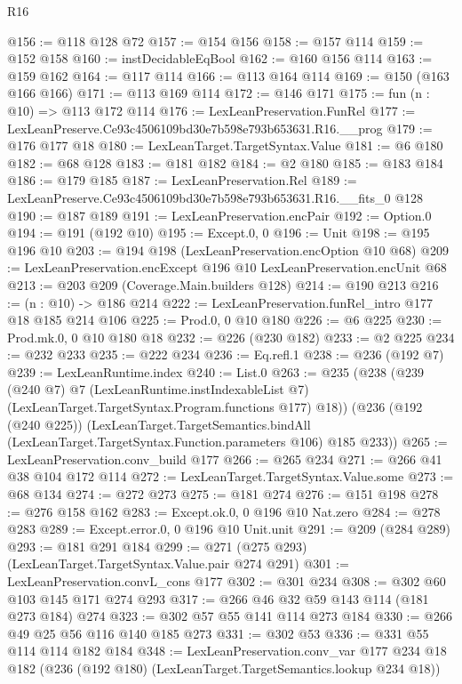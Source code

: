 \begin{lexlean}{R16}
\begin{coremodule}
@156 := @118 @128 @72
@157 := @154 @156
@158 := @157 @114
@159 := @152 @158
@160 := instDecidableEqBool
@162 := @160 @156 @114
@163 := @159 @162
@164 := @117 @114
@166 := @113 @164 @114
@169 := @150 (@163 @166 @166)
@171 := @113 @169 @114
@172 := @146 @171
@175 := fun (n : @10) => @113 @172 @114
@176 := LexLeanPreservation.FunRel
@177 := LexLeanPreserve.Ce93c4506109bd30e7b598e793b653631.R16.__prog
@179 := @176 @177 @18
@180 := LexLeanTarget.TargetSyntax.Value
@181 := @6 @180
@182 := @68 @128
@183 := @181 @182
@184 := @2 @180
@185 := @183 @184
@186 := @179 @185
@187 := LexLeanPreservation.Rel
@189 := LexLeanPreserve.Ce93c4506109bd30e7b598e793b653631.R16.__fits_0 @128
@190 := @187 @189
@191 := LexLeanPreservation.encPair
@192 := Option.{0}
@194 := @191 (@192 @10)
@195 := Except.{0, 0}
@196 := Unit
@198 := @195 @196 @10
@203 := @194 @198 (LexLeanPreservation.encOption @10 @68)
@209 := LexLeanPreservation.encExcept @196 @10 LexLeanPreservation.encUnit @68
@213 := @203 @209 (Coverage.Main.builders @128)
@214 := @190 @213
@216 := (n : @10) -> @186 @214
@222 := LexLeanPreservation.funRel_intro @177 @18 @185 @214 @106
@225 := Prod.{0, 0} @10 @180
@226 := @6 @225
@230 := Prod.mk.{0, 0} @10 @180 @18
@232 := @226 (@230 @182)
@233 := @2 @225
@234 := @232 @233
@235 := @222 @234
@236 := Eq.refl.{1}
@238 := @236 (@192 @7)
@239 := LexLeanRuntime.index
@240 := List.{0}
@263 := @235
    (@238
      (@239
        (@240 @7)
        @7
        (LexLeanRuntime.instIndexableList @7)
        (LexLeanTarget.TargetSyntax.Program.functions @177)
        @18))
    (@236
      (@192 (@240 @225))
      (LexLeanTarget.TargetSemantics.bindAll
        (LexLeanTarget.TargetSyntax.Function.parameters @106)
        @185
        @233))
@265 := LexLeanPreservation.conv_build @177
@266 := @265 @234
@271 := @266 @41 @38 @104 @172 @114
@272 := LexLeanTarget.TargetSyntax.Value.some
@273 := @68 @134
@274 := @272 @273
@275 := @181 @274
@276 := @151 @198
@278 := @276 @158 @162
@283 := Except.ok.{0, 0} @196 @10 Nat.zero
@284 := @278 @283
@289 := Except.error.{0, 0} @196 @10 Unit.unit
@291 := @209 (@284 @289)
@293 := @181 @291 @184
@299 := @271 (@275 @293) (LexLeanTarget.TargetSyntax.Value.pair @274 @291)
@301 := LexLeanPreservation.convL_cons @177
@302 := @301 @234
@308 := @302 @60 @103 @145 @171 @274 @293
@317 := @266 @46 @32 @59 @143 @114 (@181 @273 @184) @274
@323 := @302 @57 @55 @141 @114 @273 @184
@330 := @266 @49 @25 @56 @116 @140 @185 @273
@331 := @302 @53
@336 := @331 @55 @114 @114 @182 @184
@348 := LexLeanPreservation.conv_var
    @177
    @234
    @18
    @182
    (@236 (@192 @180) (LexLeanTarget.TargetSemantics.lookup @234 @18))

\end{coremodule}
\end{lexlean}
